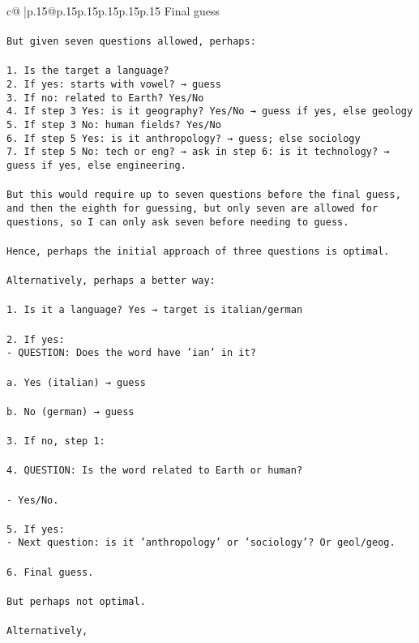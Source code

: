 \documentclass{article}
\begin{document}
{\begin{supertabular}{c@{$\;$}|p{.15\linewidth}@{}p{.15\linewidth}p{.15\linewidth}p{.15\linewidth}p{.15\linewidth}p{.15\linewidth}}
{{{Final guess\\ \tt \\ \tt But given seven questions allowed, perhaps:\\ \tt \\ \tt 1. Is the target a language?\\ \tt 2. If yes: starts with vowel? → guess\\ \tt 3. If no: related to Earth? Yes/No\\ \tt 4. If step 3 Yes: is it geography? Yes/No → guess if yes, else geology\\ \tt 5. If step 3 No: human fields? Yes/No\\ \tt 6. If step 5 Yes: is it anthropology? → guess; else sociology\\ \tt 7. If step 5 No: tech or eng? → ask in step 6: is it technology? → guess if yes, else engineering.\\ \tt \\ \tt But this would require up to seven questions before the final guess, and then the eighth for guessing, but only seven are allowed for questions, so I can only ask seven before needing to guess.\\ \tt \\ \tt Hence, perhaps the initial approach of three questions is optimal.\\ \tt \\ \tt Alternatively, perhaps a better way:\\ \tt \\ \tt 1. Is it a language? Yes → target is italian/german\\ \tt \\ \tt 2. If yes:\\ \tt    - QUESTION: Does the word have 'ian' in it?\\ \tt \\ \tt       a. Yes (italian) → guess\\ \tt \\ \tt       b. No (german) → guess\\ \tt \\ \tt 3. If no, step 1:\\ \tt \\ \tt 4. QUESTION: Is the word related to Earth or human?\\ \tt \\ \tt    - Yes/No.\\ \tt \\ \tt 5. If yes:\\ \tt    - Next question: is it 'anthropology' or 'sociology'? Or geol/geog.\\ \tt \\ \tt 6. Final guess.\\ \tt \\ \tt But perhaps not optimal.\\ \tt \\ \tt Alternatively, }}}
\end{supertabular}}
\end{document}

